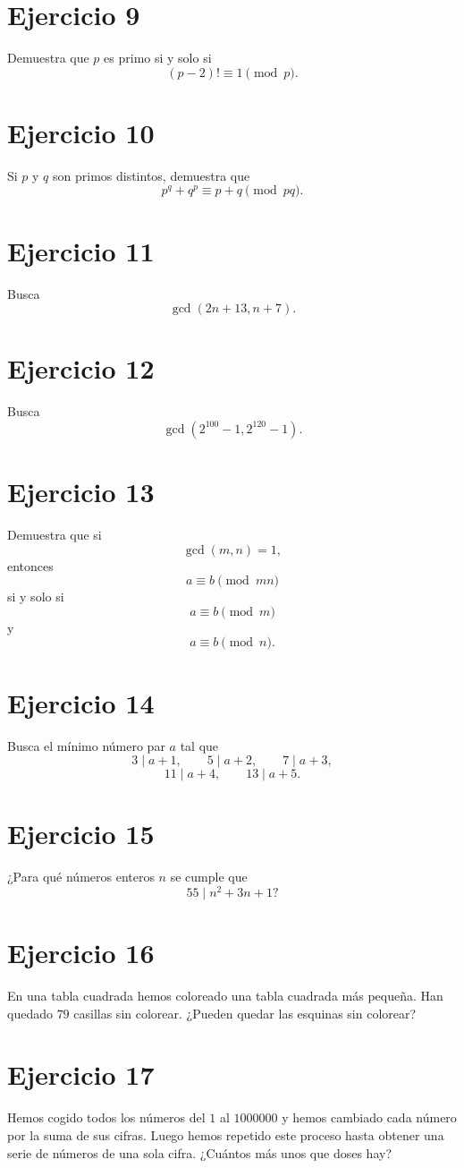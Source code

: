 \documentclass[12pt]{article}
\begin{document}
\section*{Ejercicio 9}
Demuestra que \(p\) es primo si y solo si
\[
(p-2)! \equiv 1 \pmod p.
\]

\section*{Ejercicio 10}
Si \(p\) y \(q\) son primos distintos, demuestra que
\[
p^q+q^p \equiv p+q \pmod{pq}.
\]

\section*{Ejercicio 11}
Busca
\[
\gcd(2n+13,n+7).
\]

\section*{Ejercicio 12}
Busca
\[
\gcd(2^{100}-1,2^{120}-1).
\]

\section*{Ejercicio 13}
Demuestra que si
\[
\gcd(m,n)=1,
\]
entonces
\[
a\equiv b \pmod{mn}
\]
si y solo si
\[
a\equiv b \pmod m
\]
y
\[
a\equiv b \pmod n.
\]

\section*{Ejercicio 14}
Busca el mínimo número par \(a\) tal que
\[
3\mid a+1,\qquad 5\mid a+2,\qquad 7\mid a+3,
\]
\[
11\mid a+4,\qquad 13\mid a+5.
\]

\section*{Ejercicio 15}
¿Para qué números enteros \(n\) se cumple que
\[
55\mid n^2+3n+1?
\]

\section*{Ejercicio 16}
En una tabla cuadrada hemos coloreado una tabla cuadrada más pequeña.
Han quedado \(79\) casillas sin colorear.
¿Pueden quedar las esquinas sin colorear?

\section*{Ejercicio 17}
Hemos cogido todos los números del \(1\) al \(1000000\) y hemos cambiado cada número por la suma de sus cifras.
Luego hemos repetido este proceso hasta obtener una serie de números de una sola cifra.
¿Cuántos más unos que doses hay?
\end{document}
